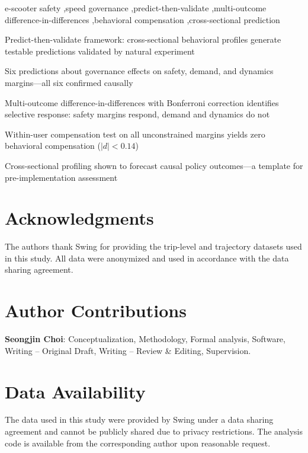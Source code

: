 \documentclass[a4paper,fleqn]{cas-sc}
\begin{document}
\begin{keywords}
e-scooter safety \sep speed governance \sep predict-then-validate \sep multi-outcome difference-in-differences \sep behavioral compensation \sep cross-sectional prediction
\end{keywords}

\begin{highlights}
\item Predict-then-validate framework: cross-sectional behavioral profiles generate testable predictions validated by natural experiment
\item Six predictions about governance effects on safety, demand, and dynamics margins---all six confirmed causally
\item Multi-outcome difference-in-differences with Bonferroni correction identifies selective response: safety margins respond, demand and dynamics do not
\item Within-user compensation test on all unconstrained margins yields zero behavioral compensation ($|d| < 0.14$)
\item Cross-sectional profiling shown to forecast causal policy outcomes---a template for pre-implementation assessment
\end{highlights}

\maketitle











\section*{Acknowledgments}
The authors thank Swing for providing the trip-level and trajectory datasets used in this study. All data were anonymized and used in accordance with the data sharing agreement.

\section*{Author Contributions}
\textbf{Seongjin Choi}: Conceptualization, Methodology, Formal analysis, Software, Writing -- Original Draft, Writing -- Review \& Editing, Supervision.

\section*{Data Availability}
The data used in this study were provided by Swing under a data sharing agreement and cannot be publicly shared due to privacy restrictions. The analysis code is available from the corresponding author upon reasonable request.



\end{document}
